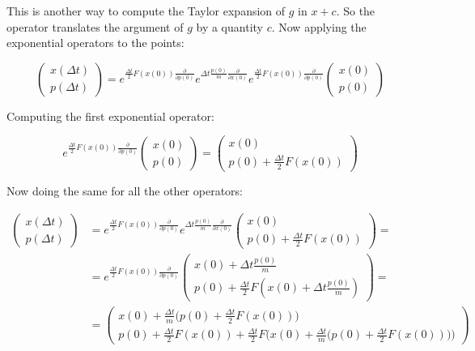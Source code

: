 	This is another way to compute the Taylor expansion of $g$ in $x+c$.
	So the operator translates the argument of $g$ by a quantity $c$.
	Now applying the exponential operators to the points:

	$$\begin{pmatrix}x(\Delta t)\\p(\Delta t)\end{pmatrix} = e^{\frac{\Delta t}{2}F(x(0))\frac{\partial}{\partial p(0)}}e^{\Delta t\frac{p(0)}{m}\frac{\partial}{\partial x(0)}}e^{\frac{\Delta t}{2}F(x(0))\frac{\partial}{\partial p(0)}}\begin{pmatrix}x(0)\\p(0)\end{pmatrix}$$

	Computing the first exponential operator:

	$$e^{\frac{\Delta t}{2}F(x(0))\frac{\partial}{\partial p(0)}}\begin{pmatrix}x(0)\\p(0)\end{pmatrix} = \begin{pmatrix}x(0)\\p(0) + \frac{\Delta t}{2}F(x(0))\end{pmatrix}$$

	Now doing the same for all the other operators:

	\begin{align*}
		\begin{pmatrix} x(\Delta t)\\ p(\Delta t)\end{pmatrix} &= e^{\frac{\Delta t}{2}F(x(0))\frac{\partial}{\partial p(0)}}e^{\Delta t\frac{p(0)}{m}\frac{\partial }{\partial x(0)}}\begin{pmatrix} x(0)\\p(0) + \frac{\Delta t}{2}F(x(0))\end{pmatrix} =\\
																													 & = e^{\frac{\Delta t}{2}F(x(0))\frac{\partial}{\partial p(0)}}\begin{pmatrix}x(0) + \Delta t\frac{p(0)}{m}\\p(0) + \frac{\Delta t}{2}F(x(0) + \Delta t\frac{p(0)}{m})\end{pmatrix} =\\
																													 &= \begin{pmatrix} x(0) + \frac{\Delta t}{m}\biggl(p(0) + \frac{\Delta t}{2}F(x(0))\biggr) \\ p(0) + \frac{\Delta t}{2}F(x(0)) + \frac{\Delta t}{2}F\biggl(x(0) + \frac{\Delta t}{m}\biggl(p(0) + \frac{\Delta t}{2}F(x(0))\biggr)\biggr)\end{pmatrix}
	\end{align*}

